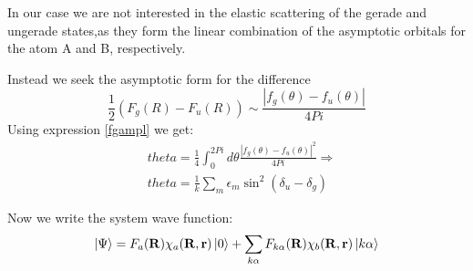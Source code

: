 In our case we are not interested in the elastic scattering of the gerade and ungerade states,as they form the linear combination of the asymptotic orbitals for the atom A and B, respectively.

Instead we seek the asymptotic form for the difference
\begin{equation}
  \frac{1}{2}\left(F_g(R) - F_u(R)\right) \sim \frac{\left|f_g(\theta) - f_u(\theta)\right|}{4Pi}
\end{equation}
Using expression \eqref{fgampl} we get:
\begin{equation}
\begin{split}
  & theta = \frac{1}{4}\int_{0}^{2Pi}d\theta\frac{\left|f_g(\theta) - f_u(\theta)\right|^2}{4Pi} \Rightarrow \\ 
  &  theta = \frac{1}{k}\sum_{m}\epsilon_m\sin^2(\delta_u-\delta_g)
\end{split}
\end{equation}

Now we write the system wave function:
\begin{equation}\label{ansatzWave1}
\Ket{\Psi} = F_a(\mathbf{R})\chi_a(\mathbf{R},\mathbf{r})\Ket{0} + \sum_{k\alpha}{F_{k\alpha}(\mathbf{R})\chi_b(\mathbf{R},\mathbf{r})\Ket{k\alpha}}
\end{equation}

